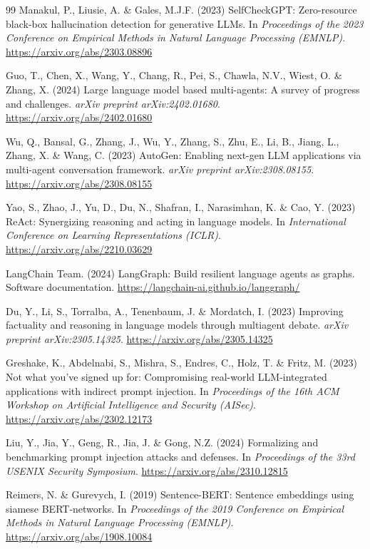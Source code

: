 \documentclass{article}
\begin{document}
\begin{thebibliography}{99}
Manakul, P., Liusie, A. \& Gales, M.J.F. (2023) SelfCheckGPT:
Zero-resource black-box hallucination detection for generative LLMs.
In \emph{Proceedings of the 2023 Conference on Empirical Methods in
Natural Language Processing (EMNLP)}.
\url{https://arxiv.org/abs/2303.08896}

Guo, T., Chen, X., Wang, Y., Chang, R., Pei, S., Chawla, N.V., Wiest, O.
\& Zhang, X. (2024) Large language model based multi-agents: A survey of
progress and challenges. \emph{arXiv preprint arXiv:2402.01680}.
\url{https://arxiv.org/abs/2402.01680}

Wu, Q., Bansal, G., Zhang, J., Wu, Y., Zhang, S., Zhu, E., Li, B.,
Jiang, L., Zhang, X. \& Wang, C. (2023) AutoGen: Enabling next-gen LLM
applications via multi-agent conversation framework. \emph{arXiv
preprint arXiv:2308.08155}. \url{https://arxiv.org/abs/2308.08155}

Yao, S., Zhao, J., Yu, D., Du, N., Shafran, I., Narasimhan, K. \&
Cao, Y. (2023) ReAct: Synergizing reasoning and acting in language
models. In \emph{International Conference on Learning Representations
(ICLR)}. \url{https://arxiv.org/abs/2210.03629}

LangChain Team. (2024) LangGraph: Build resilient language agents as
graphs. Software documentation.
\url{https://langchain-ai.github.io/langgraph/}

Du, Y., Li, S., Torralba, A., Tenenbaum, J. \& Mordatch, I. (2023)
Improving factuality and reasoning in language models through multiagent
debate. \emph{arXiv preprint arXiv:2305.14325}.
\url{https://arxiv.org/abs/2305.14325}

Greshake, K., Abdelnabi, S., Mishra, S., Endres, C., Holz, T. \&
Fritz, M. (2023) Not what you've signed up for: Compromising real-world
LLM-integrated applications with indirect prompt injection. In
\emph{Proceedings of the 16th ACM Workshop on Artificial Intelligence
and Security (AISec)}. \url{https://arxiv.org/abs/2302.12173}

Liu, Y., Jia, Y., Geng, R., Jia, J. \& Gong, N.Z. (2024) Formalizing
and benchmarking prompt injection attacks and defenses. In
\emph{Proceedings of the 33rd USENIX Security Symposium}.
\url{https://arxiv.org/abs/2310.12815}

Reimers, N. \& Gurevych, I. (2019) Sentence-BERT: Sentence embeddings
using siamese BERT-networks. In \emph{Proceedings of the 2019 Conference
on Empirical Methods in Natural Language Processing (EMNLP)}.
\url{https://arxiv.org/abs/1908.10084}


\end{thebibliography}
\end{document}

